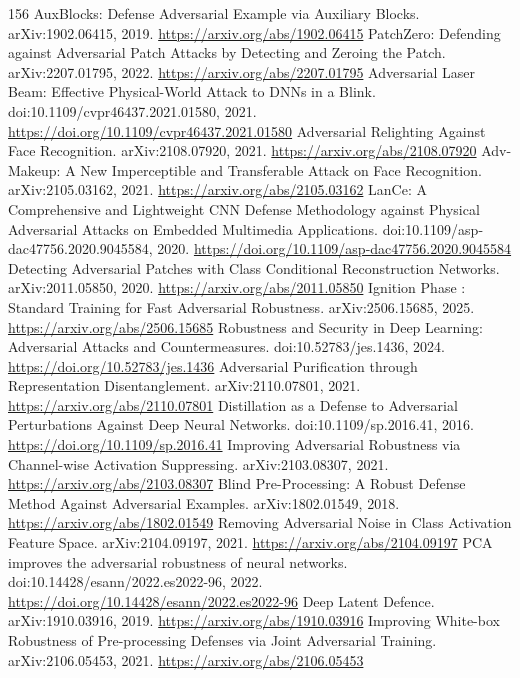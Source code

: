 \documentclass[11pt]{article}
\begin{document}
\begin{thebibliography}{156}
 AuxBlocks: Defense Adversarial Example via Auxiliary Blocks. arXiv:1902.06415, 2019. \url{https://arxiv.org/abs/1902.06415}
 PatchZero: Defending against Adversarial Patch Attacks by Detecting and Zeroing the Patch. arXiv:2207.01795, 2022. \url{https://arxiv.org/abs/2207.01795}
 Adversarial Laser Beam: Effective Physical-World Attack to DNNs in a Blink. doi:10.1109/cvpr46437.2021.01580, 2021. \url{https://doi.org/10.1109/cvpr46437.2021.01580}
 Adversarial Relighting Against Face Recognition. arXiv:2108.07920, 2021. \url{https://arxiv.org/abs/2108.07920}
 Adv-Makeup: A New Imperceptible and Transferable Attack on Face Recognition. arXiv:2105.03162, 2021. \url{https://arxiv.org/abs/2105.03162}
 LanCe: A Comprehensive and Lightweight CNN Defense Methodology against Physical Adversarial Attacks on Embedded Multimedia Applications. doi:10.1109/asp-dac47756.2020.9045584, 2020. \url{https://doi.org/10.1109/asp-dac47756.2020.9045584}
 Detecting Adversarial Patches with Class Conditional Reconstruction Networks. arXiv:2011.05850, 2020. \url{https://arxiv.org/abs/2011.05850}
 Ignition Phase : Standard Training for Fast Adversarial Robustness. arXiv:2506.15685, 2025. \url{https://arxiv.org/abs/2506.15685}
 Robustness and Security in Deep Learning: Adversarial Attacks and Countermeasures. doi:10.52783/jes.1436, 2024. \url{https://doi.org/10.52783/jes.1436}
 Adversarial Purification through Representation Disentanglement. arXiv:2110.07801, 2021. \url{https://arxiv.org/abs/2110.07801}
 Distillation as a Defense to Adversarial Perturbations Against Deep Neural Networks. doi:10.1109/sp.2016.41, 2016. \url{https://doi.org/10.1109/sp.2016.41}
 Improving Adversarial Robustness via Channel-wise Activation Suppressing. arXiv:2103.08307, 2021. \url{https://arxiv.org/abs/2103.08307}
 Blind Pre-Processing: A Robust Defense Method Against Adversarial Examples. arXiv:1802.01549, 2018. \url{https://arxiv.org/abs/1802.01549}
 Removing Adversarial Noise in Class Activation Feature Space. arXiv:2104.09197, 2021. \url{https://arxiv.org/abs/2104.09197}
 PCA improves the adversarial robustness of neural networks. doi:10.14428/esann/2022.es2022-96, 2022. \url{https://doi.org/10.14428/esann/2022.es2022-96}
 Deep Latent Defence. arXiv:1910.03916, 2019. \url{https://arxiv.org/abs/1910.03916}
 Improving White-box Robustness of Pre-processing Defenses via Joint Adversarial Training. arXiv:2106.05453, 2021. \url{https://arxiv.org/abs/2106.05453}

\end{thebibliography}
\end{document}
